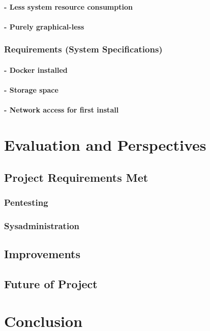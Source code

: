\documentclass[a4paper,11pt,singlespacing]{article}
\begin{document}
            \paragraph{- Less system resource consumption}
            \paragraph{- Purely graphical-less}
        \subsubsection{Requirements (System Specifications)}
            \paragraph{- Docker installed}
            \paragraph{- Storage space}
            \paragraph{- Network access for first install}

\section{Evaluation and Perspectives}
    \subsection{Project Requirements Met}
        \subsubsection{Pentesting}
        \subsubsection{Sysadministration}
    \subsection{Improvements}
    \subsection{Future of Project}

\section{Conclusion}
\end{document}

